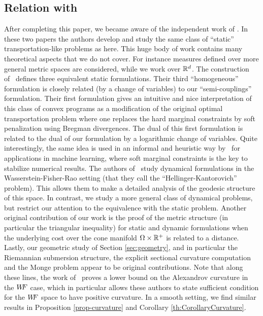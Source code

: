 \subsection[Relation with Liero,Mielke,Savare 2015]{Relation with \cite{LieroMielkeSavareLong,LieroMielkeSavareShort}}

After completing this paper, we became aware of the independent work of \cite{LieroMielkeSavareLong,LieroMielkeSavareShort}. In these two papers the authors develop and study the same class of ``static'' transportation-like problems as here. This huge body of work contains many theoretical aspects that we do not cover. For instance measures defined over more general metric spaces are considered, while we work over $\mathbb{R}^d$.
%
The construction of~\cite{LieroMielkeSavareLong} defines three equivalent static formulations. Their third ``homogeneous'' formulation is closely related (by a change of variables) to our ``semi-couplings'' formulation. Their first formulation gives an intuitive and nice interpretation of this class of convex programs as a modification of the original optimal transportation problem where one replaces the hard marginal constraints by soft penalization using Bregman divergences. The dual of this first formulation is related to the dual of our formulation by a logarithmic change of variables. Quite interestingly, the same idea is used in an informal and heuristic way by~\cite{FrognerNIPS} for applications in machine learning, where soft marginal constraints is the key to stabilize numerical results. 
%
The authors of~\cite{LieroMielkeSavareLong,LieroMielkeSavareShort} study dynamical formulations in the Wasserstein-Fisher-Rao setting (that they call the ``Hellinger-Kantorovich'' problem). This allows them to make a detailed analysis of the geodesic structure of this space. In contrast, we study a more general class of dynamical problems, but restrict our attention to the equivalence with the static problem. Another original contribution of our work is the proof of the metric structure (in particular the triangular inequality) for static and dynamic formulations when the underlying cost over the cone manifold $\Omega \times \mathbb{R}^+$ is related to a distance. 
% 
Lastly, our geometric study of Section \ref{sec:geometry}, and in particular the Riemannian submersion structure, the explicit sectional curvature computation and the Monge problem appear to be original contributions. Note that along these lines, the work of~\cite{LieroMielkeSavareLong} proves a lower bound on the Alexandrov curvature in the $W\! \! F$ case, which in particular allows these authors to state sufficient condition for the $W\! \! F$ space to have positive curvature. In a smooth setting, we find similar results in Proposition \ref{prop-curvature} and Corollary \ref{th:CorollaryCurvature}.

